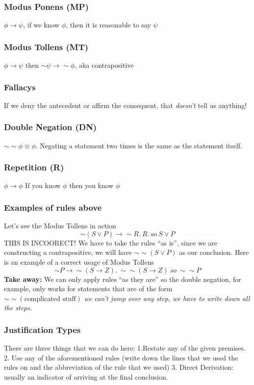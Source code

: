 \documentclass[10pt]{article}
\begin{document}
\subsubsection{Modus Ponens (MP)} $\phi \rightarrow \psi$, if we know $\phi$, then it is reasonable to say $\psi$
\subsubsection{Modus Tollens (MT)} $\phi \rightarrow \psi$ then $\sim\psi \rightarrow \sim\phi$, aka contrapositive
\subsubsection{Fallacys} If we deny the antecedent or affirm the consequent, that \textit{doesn't} tell us anything!
\subsubsection{Double Negation (DN)} $\sim\sim\phi \equiv \phi$. Negating a statement two times is the same as the statement itself.
\subsubsection{Repetition (R)} $\phi \rightarrow \phi$ If you know $\phi$ then you know $\phi$
\subsubsection{Examples of rules above}
Let's see the Modus Tollens in action
\begin{equation*}
    \sim (S\vee P) \rightarrow \sim R.~ R. ~\text{so}~ S\vee P
\end{equation*}
THIS IS INCOORECT! We have to take the rules ``as is'', since we are constructing a
contrapositive, we will have $\sim\sim (S\vee P)$ as our conclusion. Here is an example of a 
correct usage of Modus Tollens
\begin{equation*}
    \sim P \rightarrow \sim (S\rightarrow Z). ~ \sim\sim (S\rightarrow Z) ~ so ~ \sim\sim P
\end{equation*}
\textbf{Take away:} We can only apply rules ``as they are'' so the double negation, for example,
only works for statements that are of the form $\sim\sim(\text{complicated stuff})$ \textit{we can't 
jump over any step, we have to write down all the steps.}

\subsubsection{Justification Types}
There are three things that we can do here: 1.Restate any of the given premises. 
2. Use any of the aforementioned rules (write down the lines that we used the rules on and 
the abbreviation of the rule that we used) 3. Direct Derivation: usually an 
indicator of arriving at the final conclusion.
\end{document}
